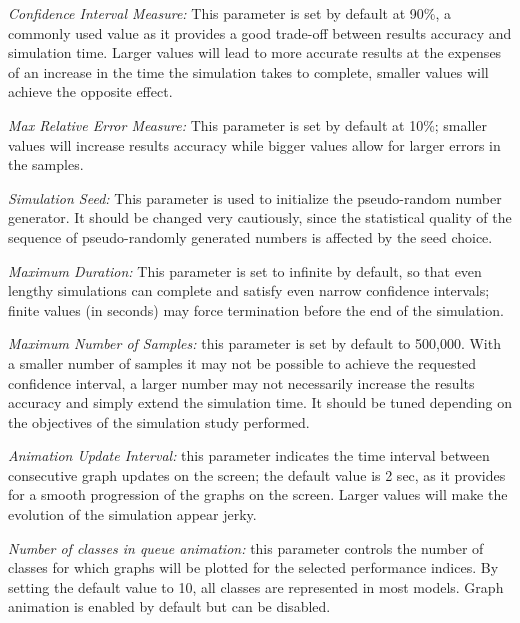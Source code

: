 \begin{itemize*}
\item \emph{Confidence Interval Measure:} This parameter is set by
default at 90\%, a commonly used value as it provides a good
trade-off between results accuracy and simulation time. Larger
values will lead to more accurate results at the expenses of an
increase in the time the simulation takes to complete, smaller
values will achieve the opposite effect. \item  \emph{Max Relative
Error Measure:} This parameter is set by default at 10\%; smaller
values will increase results accuracy while bigger values allow
for larger errors in the samples. \item \emph{Simulation Seed:}
This parameter is used to initialize the pseudo-random number
generator. It should be changed very cautiously, since the
statistical quality of the sequence of pseudo-randomly generated
numbers is affected by the seed choice. \item \emph{Maximum
Duration:} This parameter is set to infinite by default, so that
even lengthy simulations can complete and satisfy even narrow
confidence intervals; finite values (in seconds) may force
termination before the end of the simulation. \item \emph{Maximum
Number of Samples:} this parameter is set by default to 500,000.
With a smaller number of samples it may not be possible to achieve
the requested confidence interval, a larger number may not
necessarily increase the results accuracy and simply extend the
simulation time. It should be tuned depending on the objectives of
the simulation study performed. \item \emph{Animation Update
Interval:} this parameter indicates the time interval between
consecutive graph updates on the screen; the default value is 2
sec, as it provides for a smooth progression of the graphs on the
screen. Larger values will make the evolution of the simulation
appear jerky. \item \emph{Number of classes in queue animation:}
this parameter controls the number of classes for which graphs
will be plotted for the selected performance indices. By setting
the default value to 10, all classes are represented in most
models. Graph animation is enabled by default but can be disabled.
\end{itemize*}

